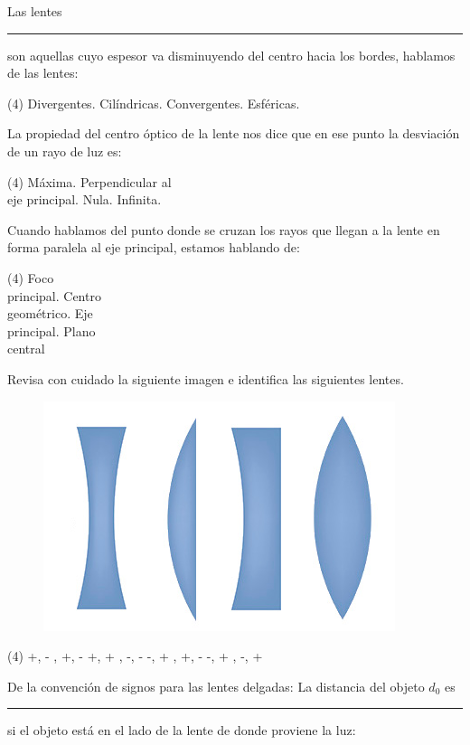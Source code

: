 \documentclass[12pt, letter]{exam}
\begin{document}
\begin{questions}
    \question Las lentes \rule{2.5cm}{0.1mm} son aquellas cuyo espesor va disminuyendo del centro hacia los bordes, hablamos de las lentes:
    \begin{tasks}(4)
        \task Divergentes.
        \task Cilíndricas.
        \task Convergentes.
        \task Esféricas.
    \end{tasks}
    \question La propiedad del centro óptico de la lente nos dice que en ese punto la desviación de un rayo de luz es:
    \begin{tasks}(4)
        \task Máxima.
        \task Perpendicular al \\ eje principal.
        \task Nula.
        \task Infinita.
    \end{tasks}
    \question Cuando hablamos del punto donde se cruzan los rayos que llegan a la lente en forma paralela al eje principal, estamos hablando de:
    \begin{tasks}(4)
        \task Foco \\ principal.
        \task Centro \\ geométrico.
        \task Eje \\ principal.
        \task Plano \\ central
    \end{tasks}
    \question Revisa con cuidado la siguiente imagen e identifica las siguientes lentes.
    \begin{figure}[H]
        \centering
        \includegraphics[scale=2]{Imagenes/Arreglo_Lentes_01.png}
    \end{figure}
    \begin{tasks}(4)
        \task +, - , +, - 
        \task +, + , -, - 
        \task -, + , +, - 
        \task -, + , -, + 
    \end{tasks}
    \question De la convención de signos para las lentes delgadas:  La distancia del objeto $d_{0}$ es \rule{2cm}{0.1mm} si el objeto está en el lado de la lente de donde proviene la luz:

\end{questions}
\end{document}
